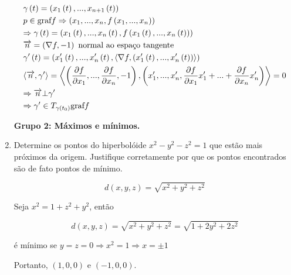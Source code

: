 \documentclass[11pt, oneside, a4paper]{gsm-l}
\begin{document}
\begin{enumerate}
\begin{sol}
\[
\begin{gathered}
  \gamma \left( t \right) = \left( {x_1 \left( t \right),...,x_{n + 1} \left( t \right)} \right) \hfill \\
  p \in {\text{graf}}f \Rightarrow \left( {x_1 ,...,x_n ,f\left( {x_1 ,...,x_n } \right)} \right) \hfill \\
   \Rightarrow \gamma \left( t \right) = \left( {x_1 \left( t \right),...,x_n \left( t \right),f\left( {x_1 \left( t \right),...,x_n \left( t \right)} \right)} \right) \hfill \\
  \overrightarrow n  = \left( {\nabla f, - 1} \right){\text{ normal ao espaço tangente}} \hfill \\
  \gamma '\left( t \right) = \left( {x_1 '\left( t \right),...,x_n '\left( t \right),\left\langle {\nabla f,\left( {x_1 '\left( t \right),...,x_n '\left( t \right)} \right)} \right\rangle } \right) \hfill \\
  \left\langle {\overrightarrow n ,\gamma '} \right\rangle  = \left\langle {\left( {\frac{{\partial f}}
{{\partial x_1 }},...,\frac{{\partial f}}
{{\partial x_n }}, - 1} \right),\left( {x_1 ',...,x_n ',\frac{{\partial f}}
{{\partial x_1 }}x_1 ' + ... + \frac{{\partial f}}
{{\partial x_n }}x_n '} \right)} \right\rangle  = 0 \hfill \\
   \Rightarrow \overrightarrow n  \bot \gamma ' \hfill \\
   \Rightarrow \gamma ' \in T_{\gamma \left( {t_0 } \right)} {\text{graf}}f \hfill \\
\end{gathered}
\]

\end{sol}

\textbf{Grupo 2: Máximos e mínimos.}

  \item Determine os pontos do hiperbol\'oide $x^2-y^2-z^2=1$ que estão mais pr\'oximos da origem. Justifique corretamente por que os pontos encontrados são de fato pontos de mínimo.

\begin{sol}
\[
d\left( {x,y,z} \right) = \sqrt {x^2  + y^2  + z^2 }
\]

Seja $x^2 = 1+z^2+y^2$, então

\[
d\left( {x,y,z} \right) = \sqrt {x^2  + y^2  + z^2 }  = \sqrt {1 + 2y^2  + 2z^2 }
\]

é mínimo se $y=z=0 \Rightarrow x^2=1 \Rightarrow x=\pm 1$

Portanto, $(1,0,0)$ e $(-1,0,0)$.


\end{sol}
\end{enumerate}
\end{document}
